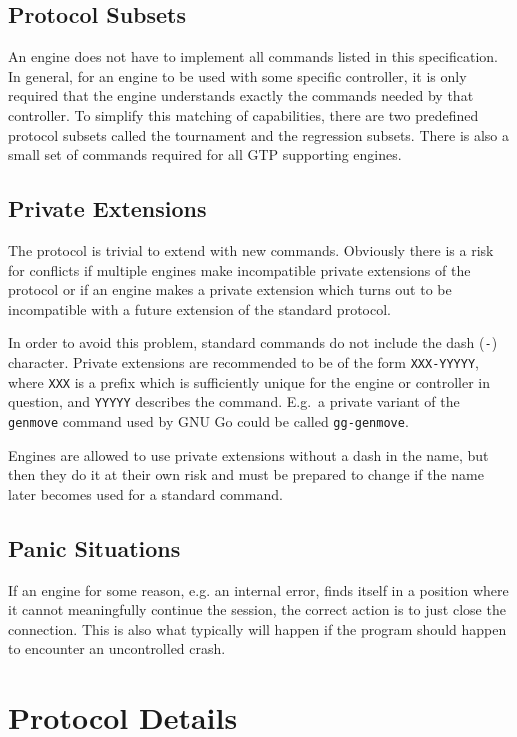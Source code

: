 \documentclass[a4paper]{article}
\begin{document}
\subsection{Protocol Subsets}
An engine does not have to implement all commands listed in this
specification. In general, for an engine to be used with some specific
controller, it is only required that the engine understands exactly the
commands needed by that controller. To simplify this matching of
capabilities, there are two predefined protocol subsets called the
tournament and the regression subsets. There is also a small set of
commands required for all GTP supporting engines.

\subsection{Private Extensions}
\label{sec:private-extensions}
The protocol is trivial to extend with new commands. Obviously there is
a risk for conflicts if multiple engines make incompatible private
extensions of the protocol or if an engine makes a private extension
which turns out to be incompatible with a future extension of the
standard protocol.

In order to avoid this problem, standard commands do not include the
dash (\texttt{-}) character. Private extensions are recommended to be of
the form \texttt{XXX-YYYYY}, where \texttt{XXX} is a prefix which is
sufficiently unique for the engine or controller in question, and
\texttt{YYYYY} describes the command. E.g.\ a private variant of the
\texttt{genmove} command used by GNU Go could be called
\texttt{gg-genmove}.

Engines are allowed to use private extensions without a dash in the
name, but then they do it at their own risk and must be prepared to
change if the name later becomes used for a standard command.

\subsection{Panic Situations}
If an engine for some reason, e.g. an internal error, finds itself in a
position where it cannot meaningfully continue the session, the correct
action is to just close the connection. This is also what typically will
happen if the program should happen to encounter an uncontrolled crash.


\newpage
\section{Protocol Details}
\end{document}
